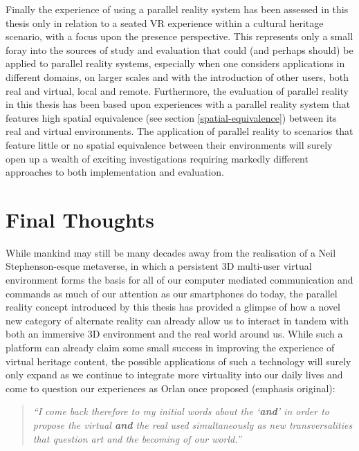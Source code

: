 Finally the experience of using a parallel reality system has been assessed in this thesis only in relation to a seated VR experience within a cultural heritage scenario, with a focus upon the presence perspective. This represents only a small foray into the sources of study and evaluation that could (and perhaps should) be applied to parallel reality systems, especially when one considers applications in different domains, on larger scales and with the introduction of other users, both real and virtual, local and remote. Furthermore, the evaluation of parallel reality in this thesis has been based upon experiences with a parallel reality system that features high spatial equivalence (see section \ref{spatial-equivalence}) between its real and virtual environments. The application of parallel reality to scenarios that feature little or no spatial equivalence between their environments will surely open up a wealth of exciting investigations requiring markedly different approaches to both implementation and evaluation.


\section{Final Thoughts}

While mankind may still be many decades away from the realisation of a Neil Stephenson-esque metaverse, in which a persistent 3D multi-user virtual environment forms the basis for all of our computer mediated communication and commands as much of our attention as our smartphones do today, the parallel reality concept introduced by this thesis has provided a glimpse of how a novel new category of alternate reality can already allow us to interact in tandem with both an immersive 3D environment and the real world around us. While such a platform can already claim some small success in improving the experience of virtual heritage content, the possible applications of such a technology will surely only expand as we continue to integrate more virtuality into our daily lives and come to question our experiences as Orlan once proposed (emphasis original):

\begin{quote}
	\textit{``I come back therefore to my initial words about the `\textbf{and}' in order to propose the virtual \textbf{and} the real used simultaneously as new transversalities that question art and the becoming of our world.''}~\cite{Orlan2002}
\end{quote}

